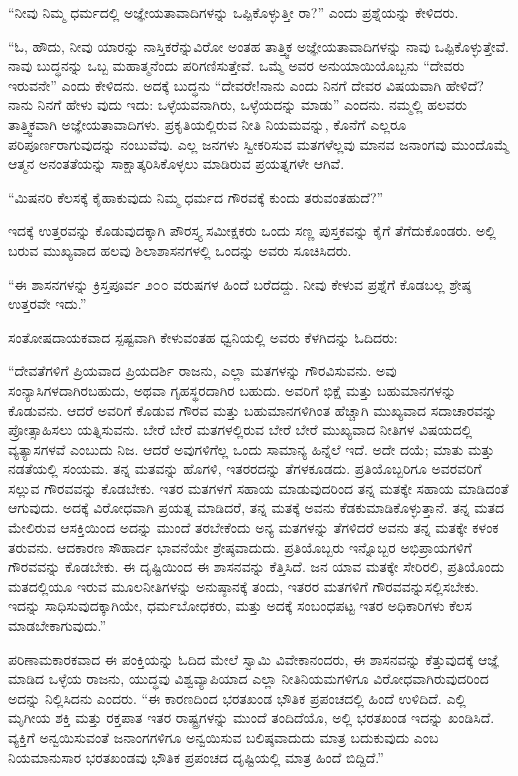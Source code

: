 “ನೀವು ನಿಮ್ಮ ಧರ್ಮದಲ್ಲಿ ಅಜ್ಞೇಯತಾವಾದಿಗಳನ್ನು ಒಪ್ಪಿಕೊಳ್ಳುತ್ತೀ ರಾ?” ಎಂದು ಪ್ರಶ್ನೆಯನ್ನು ಕೇಳಿದರು.

“ಓ, ಹೌದು, ನೀವು ಯಾರನ್ನು ನಾಸ್ತಿಕರೆನ್ನುವಿರೋ ಅಂತಹ ತಾತ್ತ್ವಿಕ ಅಜ್ಞೇಯತಾವಾದಿಗಳನ್ನು ನಾವು ಒಪ್ಪಿಕೊಳ್ಳುತ್ತೇವೆ. ನಾವು ಬುದ್ಧನನ್ನು ಒಬ್ಬ ಮಹಾತ್ಮನೆಂದು ಪರಿಗಣಿಸುತ್ತೇವೆ. ಒಮ್ಮೆ ಅವರ ಅನುಯಾಯಿಯೊಬ್ಬನು “ದೇವರು ಇರುವನೇ” ಎಂದು ಕೇಳಿದನು. ಅದಕ್ಕೆ ಬುದ್ಧನು “ದೇವರೇ!ನಾನು ಎಂದು ನಿನಗೆ ದೇವರ ವಿಷಯವಾಗಿ ಹೇಳಿದೆ? ನಾನು ನಿನಗೆ ಹೇಳು ವುದು ಇದು: ಒಳ್ಳೆಯವನಾಗಿರು, ಒಳ್ಳೆಯದನ್ನು ಮಾಡು” ಎಂದನು. ನಮ್ಮಲ್ಲಿ ಹಲವರು ತಾತ್ತ್ವಿಕವಾಗಿ ಅಜ್ಞೇಯತಾವಾದಿಗಳು. ಪ್ರಕೃತಿಯಲ್ಲಿರುವ ನೀತಿ ನಿಯಮವನ್ನು, ಕೊನೆಗೆ ಎಲ್ಲರೂ ಪರಿಪೂರ್ಣರಾಗುವುದನ್ನು ನಂಬುವೆವು. ಎಲ್ಲ ಜನಗಳು ಸ್ವೀಕರಿಸುವ ಮತಗಳೆಲ್ಲವು ಮಾನವ ಜನಾಂಗವು ಮುಂದೊಮ್ಮೆ ಆತ್ಮನ ಅನಂತತೆಯನ್ನು ಸಾಕ್ಷಾತ್ಕರಿಸಿಕೊಳ್ಳಲು ಮಾಡಿರುವ ಪ್ರಯತ್ನಗಳೇ ಆಗಿವೆ.

“ಮಿಷನರಿ ಕೆಲಸಕ್ಕೆ ಕೈಹಾಕುವುದು ನಿಮ್ಮ ಧರ್ಮದ ಗೌರವಕ್ಕೆ ಕುಂದು ತರುವಂತಹುದೆ?”

ಇದಕ್ಕೆ ಉತ್ತರವನ್ನು ಕೊಡುವುದಕ್ಕಾಗಿ ಪೌರಸ್ತ್ಯ ಸಮೀಕ್ಷಕರು ಒಂದು ಸಣ್ಣ ಪುಸ್ತಕವನ್ನು ಕೈಗೆ ತೆಗೆದುಕೊಂಡರು. ಅಲ್ಲಿ ಬರುವ ಮುಖ್ಯವಾದ ಹಲವು ಶಿಲಾಶಾಸನಗಳಲ್ಲಿ ಒಂದನ್ನು ಅವರು ಸೂಚಿಸಿದರು.

“ಈ ಶಾಸನಗಳನ್ನು ಕ್ರಿಸ್ತಪೂರ್ವ ೨೦೦ ವರುಷಗಳ ಹಿಂದೆ ಬರೆದದ್ದು. ನೀವು ಕೇಳುವ ಪ್ರಶ್ನೆಗೆ ಕೊಡಬಲ್ಲ ಶ್ರೇಷ್ಠ ಉತ್ತರವೇ ಇದು.”

ಸಂತೋಷದಾಯಕವಾದ ಸ್ಪಷ್ಟವಾಗಿ ಕೇಳುವಂತಹ ಧ್ವನಿಯಲ್ಲಿ ಅವರು ಕೆಳಗಿದನ್ನು ಓದಿದರು:

“ದೇವತೆಗಳಿಗೆ ಪ್ರಿಯವಾದ ಪ್ರಿಯದರ್ಶಿ ರಾಜನು, ಎಲ್ಲಾ ಮತಗಳನ್ನು ಗೌರವಿಸುವನು. ಅವು ಸಂನ್ಯಾಸಿಗಳದಾಗಿರಬಹುದು, ಅಥವಾ ಗೃಹಸ್ಥರದಾಗಿರ ಬಹುದು. ಅವರಿಗೆ ಭಿಕ್ಷೆ ಮತ್ತು ಬಹುಮಾನಗಳನ್ನು ಕೊಡುವನು. ಆದರೆ ಅವರಿಗೆ ಕೊಡುವ ಗೌರವ ಮತ್ತು ಬಹುಮಾನಗಳಿಗಿಂತ ಹೆಚ್ಚಾಗಿ ಮುಖ್ಯವಾದ ಸದಾಚಾರವನ್ನು ಪ್ರೋತ್ಸಾಹಿಸಲು ಯತ್ನಿಸುವನು. ಬೇರೆ ಬೇರೆ ಮತಗಳಲ್ಲಿರುವ ಬೇರೆ ಬೇರೆ ಮುಖ್ಯವಾದ ನೀತಿಗಳ ವಿಷಯದಲ್ಲಿ ವ್ಯತ್ಯಾಸಗಳವೆ ಎಂಬುದು ನಿಜ. ಆದರೆ ಅವುಗಳಿಗೆಲ್ಲ ಒಂದು ಸಾಮಾನ್ಯ ಹಿನ್ನೆಲೆ ಇದೆ. ಅದೇ ದಯೆ; ಮಾತು ಮತ್ತು ನಡತೆಯಲ್ಲಿ ಸಂಯಮ. ತನ್ನ ಮತವನ್ನು ಹೊಗಳಿ, ಇತರರದನ್ನು ತೆಗಳಕೂಡದು. ಪ್ರತಿಯೊಬ್ಬರಿಗೂ ಅವರವರಿಗೆ ಸಲ್ಲುವ ಗೌರವವನ್ನು ಕೊಡಬೇಕು. ಇತರ ಮತಗಳಗೆ ಸಹಾಯ ಮಾಡುವುದರಿಂದ ತನ್ನ ಮತಕ್ಕೇ ಸಹಾಯ ಮಾಡಿದಂತೆ ಆಗುವುದು. ಅದಕ್ಕೆ ವಿರೋಧವಾಗಿ ಪ್ರಯತ್ನ ಮಾಡಿದರೆ, ತನ್ನ ಮತಕ್ಕೆ ಅವನು ಕೆಡಕುಮಾಡಿಕೊಳ್ಳುತ್ತಾನೆ. ತನ್ನ ಮತದ ಮೇಲಿರುವ ಆಸಕ್ತಿಯಿಂದ ಅದನ್ನು ಮುಂದೆ ತರಬೇಕೆಂದು ಅನ್ಯ ಮತಗಳನ್ನು ತೆಗಳಿದರೆ ಅವನು ತನ್ನ ಮತಕ್ಕೇ ಕಳಂಕ ತರುವನು. ಆದಕಾರಣ ಸೌಹಾರ್ದ ಭಾವನೆಯೇ ಶ್ರೇಷ್ಠವಾದುದು. ಪ್ರತಿಯೊಬ್ಬರು ಇನ್ನೊಬ್ಬರ ಅಭಿಪ್ರಾಯಗಳಿಗೆ ಗೌರವವನ್ನು ಕೊಡಬೇಕು. ಈ ದೃಷ್ಟಿಯಿಂದ ಈ ಶಾಸನವನ್ನು ಕೆತ್ತಿಸಿದೆ. ಜನ ಯಾವ ಮತಕ್ಕೇ ಸೇರಿರಲಿ, ಪ್ರತಿಯೊಂದು ಮತದಲ್ಲಿಯೂ ಇರುವ ಮೂಲನೀತಿಗಳನ್ನು ಅನುಷ್ಠಾನಕ್ಕೆ ತಂದು, ಇತರರ ಮತಗಳಿಗೆ ಗೌರವವನ್ನುಸಲ್ಲಿಸಬೇಕು. ಇದನ್ನು ಸಾಧಿಸುವುದಕ್ಕಾಗಿಯೇ, ಧರ್ಮಬೋಧಕರು, ಮತ್ತು ಅದಕ್ಕೆ ಸಂಬಂಧಪಟ್ಟ ಇತರ ಅಧಿಕಾರಿಗಳು ಕೆಲಸ ಮಾಡಬೇಕಾಗುವುದು.”

ಪರಿಣಾಮಕಾರಕವಾದ ಈ ಪಂಕ್ತಿಯನ್ನು ಓದಿದ ಮೇಲೆ ಸ್ವಾಮಿ ವಿವೇಕಾನಂದರು, ಈ ಶಾಸನವನ್ನು ಕೆತ್ತುವುದಕ್ಕೆ ಆಜ್ಞೆ ಮಾಡಿದ ಒಳ್ಳೆಯ ರಾಜನು, ಯುದ್ಧವು ವಿಶ್ವವ್ಯಾಪಿಯಾದ ಎಲ್ಲಾ ನೀತಿನಿಯಮಗಳಿಗೂ ವಿರೋಧವಾಗಿರುವುದರಿಂದ ಅದನ್ನು ನಿಲ್ಲಿಸಿದನು ಎಂದರು. “ಈ ಕಾರಣದಿಂದ ಭರತಖಂಡ ಭೌತಿಕ ಪ್ರಪಂಚದಲ್ಲಿ ಹಿಂದೆ ಉಳಿದಿದೆ. ಎಲ್ಲಿ ಮೃಗೀಯ ಶಕ್ತಿ ಮತ್ತು ರಕ್ತಪಾತ ಇತರ ರಾಷ್ಟ್ರಗಳನ್ನು ಮುಂದೆ ತಂದಿದೆಯೊ, ಅಲ್ಲಿ ಭರತಖಂಡ ಇದನ್ನು ಖಂಡಿಸಿದೆ. ವ್ಯಕ್ತಿಗೆ ಅನ್ವಯಿಸುವಂತೆ ಜನಾಂಗಗಳಿಗೂ ಅನ್ವಯಿಸುವ ಬಲಿಷ್ಠವಾದುದು ಮಾತ್ರ ಬದುಕುವುದು ಎಂಬ ನಿಯಮಾನುಸಾರ ಭರತಖಂಡವು ಭೌತಿಕ ಪ್ರಪಂಚದ ದೃಷ್ಟಿಯಲ್ಲಿ ಮಾತ್ರ ಹಿಂದೆ ಬಿದ್ದಿದೆ.”

